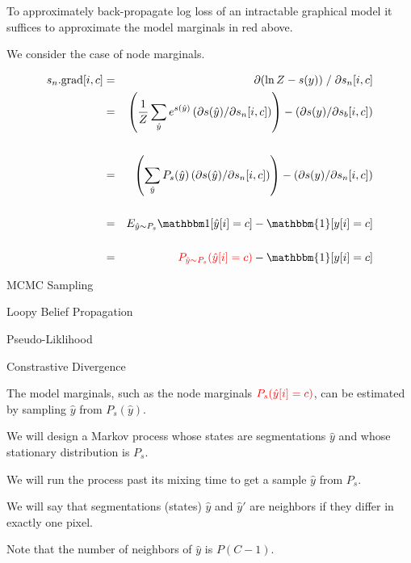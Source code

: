 {\vfill
To approximately back-propagate log loss of an intractable graphical model it suffices to approximate
{\color{red} the model marginals} in red above.


We consider the case of node marginals.

{\huge \begin{eqnarray*}
    s_n.\mathrm{grad}[i,c] & = & \partial (\ln Z - s(y))\;/\;\partial s_n[i,c] \\
    & = & \left(\frac{1}{Z} \sum_{\hat{y}} e^{s(\hat{y})} \left(\partial s(\hat{y})/\partial s_n[i,c]\right)\right)
    - \left(\partial s(y) /\partial s_b[i,c]\right)    \\
    \\
    & = & \left(\sum_{\hat{y}} P_s(\hat{y}) \left(\partial s(\hat{y})/\partial s_n[i,c]\right)\right)
    - \left(\partial s(y) /\partial s_n[i,c]\right)    \\
    \\
    & = & E_{\hat{y} \sim P_s}\bbone[\hat{y}[i] = c]
    - \mathbbm{1}[y[i] = c] \\
    \\
    & = & {\color{red} P_{\hat{y} \sim P_s}(\hat{y}[i] = c)}
      - \mathbbm{1}[y[i] = c]
\end{eqnarray*}
}


MCMC Sampling

\vfill
Loopy Belief Propagation

\vfill
Pseudo-Liklihood

\vfill
Constrastive Divergence

The model marginals, such as the node marginals
 ${\color{red} P_s(\hat{y}[i]=c)}$, can be estimated by sampling $\hat{y}$ from $P_s(\hat{y})$.

\vfill
We will design a Markov process whose states are segmentations $\hat{y}$ and whose stationary distribution is $P_s$.

\vfill
We will run the process past its mixing time to get a sample $\hat{y}$ from $P_s$.


We will say that segmentations (states) $\hat{y}$ and $\hat{y}'$ are neighbors if they differ in exactly one pixel.

\vfill
Note that the number of neighbors of $\hat{y}$ is $P(C-1)$.

}
